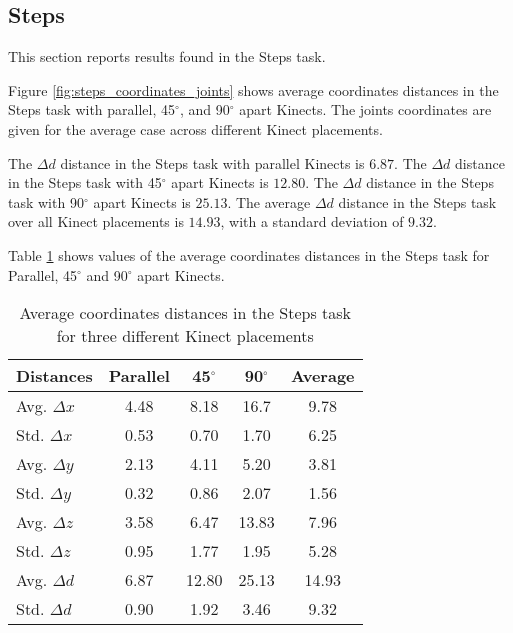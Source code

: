 % 
% 
\FloatBarrier
\subsection{Steps}

This section reports results found in the Steps task.

Figure \ref{fig:steps_coordinates_joints} shows average coordinates distances in the Steps task with parallel, 45$^{\circ}$, and 90$^{\circ}$ apart Kinects. The joints coordinates are given for the average case across different Kinect placements.

The $\Delta d$ distance in the Steps task with parallel Kinects is $6.87$. The $\Delta d$ distance in the Steps task with 45$^{\circ}$ apart Kinects is $12.80$. The $\Delta d$ distance in the Steps task with 90$^{\circ}$ apart Kinects is $25.13$. The average $\Delta d$ distance in the Steps task over all Kinect placements is $14.93$, with a standard deviation of $9.32$.

\begin{figure*}[!htb]
  \centering

  
  

  \caption{Average coordinates distances in the Steps task with Parallel, 45$^{\circ}$ and 90$^{\circ}$ apart Kinects. The joints distances are given for the average case.}

  \label{fig:steps_coordinates_joints}
\end{figure*}

Table \ref{table:steps_coordinates_values} shows values of the average coordinates distances in the Steps task for Parallel, 45$^{\circ}$ and 90$^{\circ}$ apart Kinects.

\begin{table}[!htb]
\centering
\begin{tabularx}{1.0\columnwidth}{||X c c c c||} 
 \hline
 \textbf{Distances} & \textbf{Parallel} & \textbf{45$^{\circ}$} & \textbf{90$^{\circ}$} & \textbf{Average} \\ [0.5ex] 
 \hline\hline
 Avg. $\Delta x$ & 4.48 & 8.18 & 16.7 & 9.78 \\
 \hline
 Std. $\Delta x$ & 0.53 & 0.70 & 1.70 & 6.25 \\
 \hline
 Avg. $\Delta y$ & 2.13 & 4.11 & 5.20 & 3.81 \\
 \hline
 Std. $\Delta y$ & 0.32 & 0.86 & 2.07 & 1.56 \\
 \hline
 Avg. $\Delta z$ & 3.58 & 6.47 & 13.83 & 7.96 \\
 \hline
 Std. $\Delta z$ & 0.95 & 1.77 & 1.95 & 5.28 \\
 \hline
 Avg. $\Delta d$ & 6.87 & 12.80 & 25.13 & 14.93 \\
 \hline
 Std. $\Delta d$ & 0.90 & 1.92 & 3.46 & 9.32 \\
 \hline
\end{tabularx}
\caption{Average coordinates distances in the Steps task for three different Kinect placements}
\label{table:steps_coordinates_values}
\end{table}

